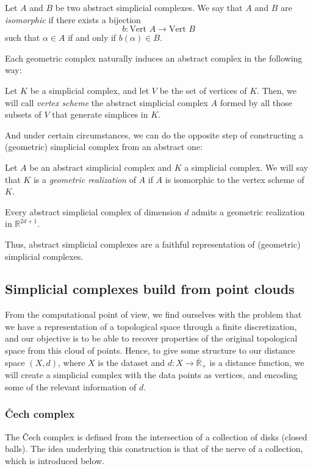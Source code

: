 \documentclass[../main.tex]{subfiles}
\begin{document}
\begin{definition}
Let $A$ and $B$ be two abstract simplicial complexes. We say that $A$ and $B$ are \emph{isomorphic} if there exists a bijection \[b:\text{Vert }A \to \text{Vert }B\] such that $\alpha \in A$ if and only if $b(\alpha) \in B$.
\end{definition}

Each geometric complex naturally induces an abstract complex in the following way:
\begin{definition}
Let $K$ be a simplicial complex, and let $V$ be the set of vertices of $K$. Then, we will call \emph{vertex scheme} the abstract simplicial complex $A$ formed by all those subsets of $V$ that generate simplices in $K$.
\end{definition}

And under certain circumstances, we can do the opposite step of constructing a (geometric) simplicial complex from an abstract one:
\begin{definition}
Let $A$ be an abstract simplicial complex and $K$ a simplicial complex. We will say that $K$ is a \emph{geometric realization} of $A$ if $A$ is isomorphic to the vertex scheme of $K$.
\end{definition}

\begin{theorem}
Every abstract simplicial complex of dimension $d$ admits a geometric realization in $\mathbb{R}^{2d + 1}$.
\end{theorem}

Thus, abstract simplicial complexes are a faithful representation of (geometric) simplicial complexes.

\subsection{Simplicial complexes build from point clouds}
From the computational point of view, we find ourselves with the problem that we have a representation of a topological space through a finite discretization, and our objective is to be able to recover properties of the original topological space from this cloud of points. Hence, to give some structure to our distance space $(X,d)$, where $X$ is the dataset and $d: X \to \overline{\mathbb{R}}_+$ is a distance function, we will create a simplicial complex with the data points as vertices, and encoding some of the relevant information of $d$.

\subsubsection*{\v{C}ech complex}
The \v{C}ech complex is defined from the intersection of a collection of disks (closed balls). The idea underlying this construction is that of the nerve of a collection, which is introduced below.
\end{document}

